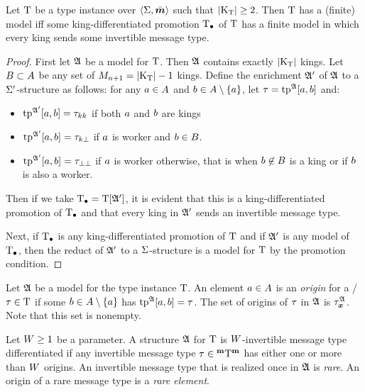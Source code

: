 \begin{remark}\label{rem:kings-rare}
Let $\mathrm{T}$ be a type instance over $\left\langle \mathrm{\Sigma},\bar{\bm{m}} \right\rangle$ such that
$\left|{\mathrm{K}}_{\mathrm{T}}\right|\geq2$.
Then $\mathrm{T}$ has a (finite) model iff some king-differentiated promotion $\mathrm{T}_{\bullet}$ of
$\mathrm{T}$ has a finite model in which every king sends some invertible message type.
\end{remark}
\begin{proof}
First let $\mathfrak{A}$ be a model for $\mathrm{T}$.
Then $\mathfrak{A}$ contains exactly $\left|{\mathrm{K}}_{\mathrm{T}}\right|$ kings.
Let $B\subset A$ be any set of $M_{n+1} = \left|{\mathrm{K}}_{\mathrm{T}}\right|-1$ kings.
Define the enrichment $\mathfrak{A'}$ of $\mathfrak{A}$ to a $\mathrm{\Sigma'}$-structure as follows:
for any $a\in A$ and $b\in A\setminus\left\{a\right\}$, let $\tau=\operatorname{tp}^{\mathfrak{A}}[a,b]$
and:
\begin{itemize}
  \item $\operatorname{tp}^{\mathfrak{A'}}[a,b] = {\tau}_{kk}$ if both $a$ and $b$ are kings
  \item $\operatorname{tp}^{\mathfrak{A'}}[a,b] = {\tau}_{k\bot}$ if $a$ is worker and
  $b\in B$.
  \item $\operatorname{tp}^{\mathfrak{A'}}[a,b] = {\tau}_{\bot\bot}$ if $a$ is worker otherwise,
  that is when $b\not\in B$ is a king or if $b$ is also a worker.
\end{itemize}
Then if we take $\mathrm{T}_{\bullet} = \mathrm{T}[\mathfrak{A'}]$, it is evident that this is a
king-differentiated promotion of $\mathrm{T}_{\bullet}$ and that every king in $\mathfrak{A'}$ sends an
invertible message type.

Next, if $\mathrm{T}_{\bullet}$ is any king-differentiated promotion of $\mathrm{T}$ and if $\mathfrak{A'}$ is
any model of $\mathrm{T}_{\bullet}$, then the reduct of $\mathfrak{A'}$ to a $\mathrm{\Sigma}$-structure is a
model for $\mathrm{T}$ by the promotion condition.
\end{proof}

\begin{definition}
Let $\mathfrak{A}$ be a model for the type instance $\mathrm{T}$.
An element $a\in A$ is an \emph{origin} for a \twotype/ $\tau\in\mathrm{T}$ if
some $b\in A\setminus\left\{a\right\}$ has $\operatorname{tp}^{\mathfrak{A}}[a,b] = \tau$.
The set of origins of $\tau$ in $\mathfrak{A}$ is ${\tau}_{\bm{x}}^{\mathfrak{A}}$.
Note that this set is nonempty.
\end{definition}
\begin{definition}
Let $W\geq1$ be a parameter.
A structure $\mathfrak{A}$ for $\mathrm{T}$ is $W$-invertible message type differentiated
if any invertible message type $\tau\in{{}^{\bm{\mathrm{m}}}{\mathrm{T}}^{\bm{\mathrm{m}}}}$ has either one or more than $W$
origins.
An invertible message type that is realized once in $\mathfrak{A}$ is \emph{rare}.
An origin of a rare message type is a \emph{rare element}.
\end{definition}

